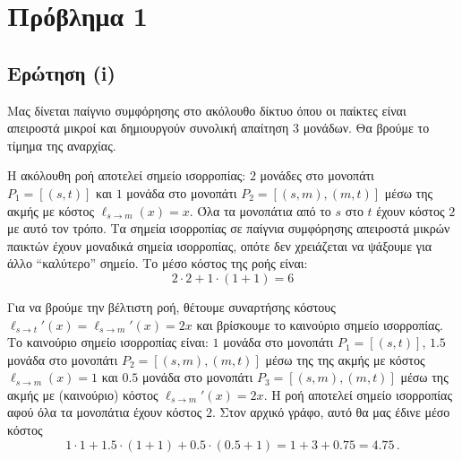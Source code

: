 \section{Πρόβλημα 1}

\subsection{Ερώτηση (i)}

Μας δίνεται παίγνιο συμφόρησης στο ακόλουθο δίκτυο όπου οι παίκτες είναι
απειροστά μικροί και δημιουργούν συνολική απαίτηση 3 μονάδων. Θα βρούμε το
τίμημα της αναρχίας.

\begin{center}
\end{center}

Η ακόλουθη ροή αποτελεί σημείο ισορροπίας: $2$ μονάδες στο μονοπάτι
$P_1 = [(s, t)]$ και $1$ μονάδα στο μονοπάτι $P_2 = [(s, m), (m, t)]$ μέσω της
ακμής με κόστος $\ell_{s \to m}(x) = x$. Όλα τα μονοπάτια από το $s$ στο $t$
έχουν κόστος $2$ με αυτό τον τρόπο. Τα σημεία ισορροπίας σε παίγνια συμφόρησης
απειροστά μικρών παικτών έχουν μοναδικά σημεία ισορροπίας, οπότε δεν χρειάζεται
να ψάξουμε για άλλο ``καλύτερο'' σημείο. Το μέσο κόστος της ροής είναι:
$$
    2 \cdot 2 + 1 \cdot (1 + 1) = 6
$$

Για να βρούμε την βέλτιστη ροή, θέτουμε συναρτήσης κόστους
$\ell_{s \to t}'(x) = \ell_{s \to m}'(x) = 2x$ και βρίσκουμε το καινούριο σημείο
ισορροπίας. Το καινούριο σημείο ισορροπίας είναι: $1$ μονάδα στο μονοπάτι
$P_1 = [(s, t)]$, $1.5$ μονάδα στο μονοπάτι $P_2 = [(s, m), (m, t)]$ μέσω της
της ακμής με κόστος $\ell_{s \to m}(x) = 1$ και $0.5$ μονάδα στο μονοπάτι
$P_3 = [(s, m), (m, t)]$ μέσω της ακμής με (καινούριο) κόστος
$\ell_{s \to m}'(x) = 2x$. Η ροή αποτελεί σημείο ισορροπίας αφού όλα τα μονοπάτια
έχουν κόστος $2$. Στον αρχικό γράφο, αυτό θα μας έδινε μέσο κόστος
$$
    1 \cdot 1 + 1.5 \cdot (1 + 1) + 0.5 \cdot (0.5 + 1) = 1 + 3 + 0.75 = 4.75 \,.
$$

